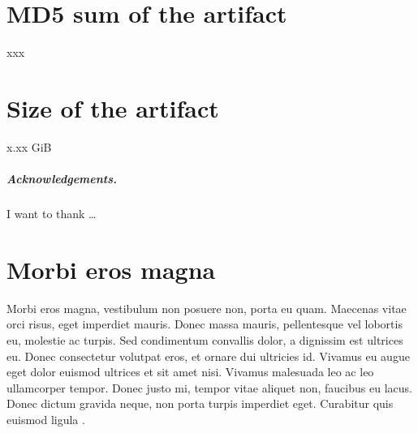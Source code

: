 \documentclass[a4paper,UKenglish]{darts-v2019}
\newcommand{\mdsum}[1]{{\section{MD5 sum of the artifact}#1}}
\newcommand{\artifactsize}[1]{{\section{Size of the artifact}#1}}
\begin{document}
\mdsum{xxx}

\artifactsize{x.xx GiB}

\subparagraph*{Acknowledgements.}

I want to thank \dots

\appendix
\section{Morbi eros magna}

Morbi eros magna, vestibulum non posuere non, porta eu quam. Maecenas vitae orci risus, eget imperdiet mauris. Donec massa mauris, pellentesque vel lobortis eu, molestie ac turpis. Sed condimentum convallis dolor, a dignissim est ultrices eu. Donec consectetur volutpat eros, et ornare dui ultricies id. Vivamus eu augue eget dolor euismod ultrices et sit amet nisi. Vivamus malesuada leo ac leo ullamcorper tempor. Donec justo mi, tempor vitae aliquet non, faucibus eu lacus. Donec dictum gravida neque, non porta turpis imperdiet eget. Curabitur quis euismod ligula \cite{DBLP:books/mk/GrayR93,DBLP:conf/focs/FOCS16,DBLP:conf/focs/HopcroftPV75,DBLP:journals/cacm/Dijkstra68a,DBLP:journals/cacm/Knuth74}. 







\end{document}
